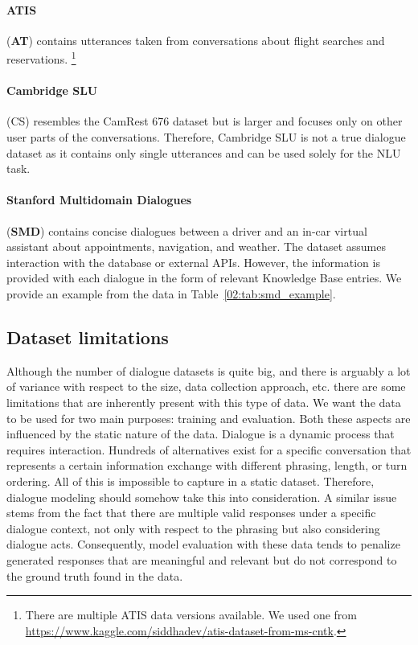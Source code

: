 \paragraph{ATIS} (\textbf{AT}) \cite{hemphill_atis_1990} contains utterances taken from conversations about flight searches and reservations. \footnote{There are multiple ATIS data versions available. We used one from \url{https://www.kaggle.com/siddhadev/atis-dataset-from-ms-cntk}.}

\paragraph{Cambridge SLU} (CS) \cite{henderson2012discriminative} resembles the CamRest 676 dataset but is larger and focuses only on other user parts of the conversations.
Therefore, Cambridge SLU is not a true dialogue dataset as it contains only single utterances and can be used solely for the NLU task.

\paragraph{Stanford Multidomain Dialogues} (\textbf{SMD}) \cite{eric-etal-2017-key} contains concise dialogues between a driver and an in-car virtual assistant about appointments, navigation, and weather.
The dataset assumes interaction with the database or external APIs.
However, the information is provided with each dialogue in the form of relevant Knowledge Base entries.
We provide an example from the data in Table~\ref{02:tab:smd_example}.

\subsection{Dataset limitations}
\label{02:sec:data-limits}
Although the number of dialogue datasets is quite big, and there is arguably a lot of variance with respect to the size, data collection approach, etc. there are some limitations that are inherently present with this type of data.
We want the data to be used for two main purposes: training and evaluation.
Both these aspects are influenced by the static nature of the data.
Dialogue is a dynamic process that requires interaction.
Hundreds of alternatives exist for a specific conversation that represents a certain information exchange with different phrasing, length, or turn ordering.
All of this is impossible to capture in a static dataset.
Therefore, dialogue modeling should somehow take this into consideration.
A similar issue stems from the fact that there are multiple valid responses under a specific dialogue context, not only with respect to the phrasing but also considering dialogue acts.
Consequently, model evaluation with these data tends to penalize generated responses that are meaningful and relevant but do not correspond to the ground truth found in the data.

